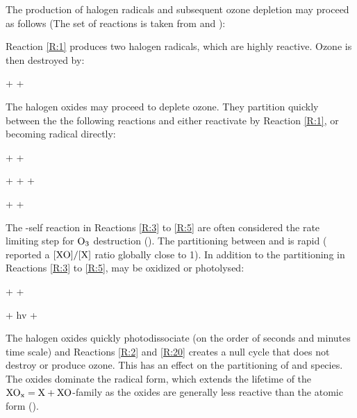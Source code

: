 \medskip



The production of halogen radicals and subsequent ozone depletion may proceed as follows (The set of reactions is taken from \cite{CAO} and \cite{Simpson2015}): 

\medskip

Reaction \ref{R:1} produces two halogen radicals, which are highly reactive. Ozone is then destroyed by: 

\begin{reaction}
     +  \rightarrow {} + 
    \label{R:2}
\end{reaction}

The halogen oxides may proceed to deplete ozone. They partition quickly between the the following reactions and either reactivate by Reaction \ref{R:1}, or becoming radical directly:


\begin{reaction}
     +  \rightarrow {} +  \label{R:3} 
\end{reaction}


\begin{reaction}
     +  \rightarrow {} +  +  \label{R:4} 
\end{reaction}


\begin{reaction}
     +  \rightarrow {} +  \label{R:5} 
\end{reaction}

The -self reaction in Reactions \ref{R:3} to \ref{R:5} are often considered the rate limiting step for $\mathrm{O_3}$ destruction (\cite{JPL}). The partitioning between  and  is rapid (\cite{Schmidt} reported a $[\mathrm{XO}]/[\mathrm{X}]$ ratio globally close to 1). In addition to the partitioning in Reactions \ref{R:3} to \ref{R:5},  may be oxidized or photolysed:  

\begin{reaction}
     +  \rightarrow {} + 
    \label{R:15}
\end{reaction}

\begin{reaction}
     + hv \rightarrow {} + 
    \label{R:20}
\end{reaction}

The halogen oxides quickly photodissociate (on the order of seconds and minutes time scale) and Reactions \ref{R:2} and \ref{R:20} creates a null cycle that does not destroy or produce ozone. This has an effect on the partitioning of  and  species. The oxides dominate the radical form, which extends the lifetime of the $\mathrm{XO_x} = \mathrm{X} + \mathrm{XO}$-family as the oxides are generally less reactive than the atomic form (\cite{Simpson2015}). 


